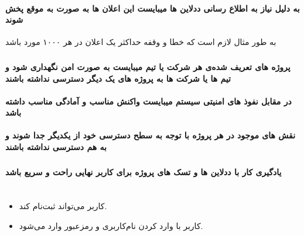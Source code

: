 \documentclass[10pt,a4paper]{article}
\begin{document}
	\subsection{به دلیل نیاز به اطلاع رسانی ددلاین ها میبایست این اعلان ها به صورت به موقع پخش شوند}
	به طور مثال لازم است که خطا و وقفه حداکثر یک اعلان در هر ۱۰۰۰ مورد باشد
	\section{}
	\subsection{پروژه های تعریف شده‌ی هر شرکت یا تیم میبایست به صورت امن نگهداری شود و تیم ها یا شرکت ها به پروژه های یک دیگر دسترسی نداشته باشند}
	\subsection{در مقابل نفوذ های امنیتی سیستم میبایست واکنش مناسب و آمادگی مناسب داشته باشد}
	\subsection{نقش های موجود در هر پروژه با توجه به سطح دسترسی خود از یکدیگر جدا شوند و به هم دسترسی نداشته باشند}
	\section{}
	\subsection{یادگیری کار با ددلاین ها و تسک های پروژه برای کاربر نهایی راحت و سریع باشد}
	\newpage
	
	\part{}
	\section{
	}
\begin{itemize}
	\item 
	کاربر می‌تواند ثبت‌نام کند.
	\item
	کاربر با وارد کردن نام‌کاربری و رمزعبور وارد می‌شود.
\end{itemize}

	\section{
	}
\end{document}
